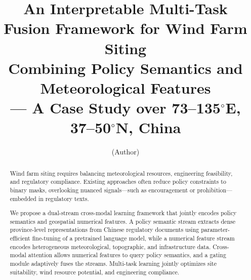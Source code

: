 \documentclass[12pt, a4paper]{article}
\begin{document}
\title{\textbf{An Interpretable Multi-Task Fusion Framework for
Wind Farm Siting\\[0.3em]
Combining Policy Semantics and Meteorological Features}\\[0.5em]
{\large --- A Case Study over 73--135$^\circ$E, 37--50$^\circ$N, China}}
\author{(Author)}
\date{}
\maketitle
\thispagestyle{fancy}

\begin{abstract}
Wind farm siting requires balancing meteorological resources, engineering feasibility, and regulatory compliance. Existing approaches often reduce policy constraints to binary masks, overlooking nuanced signals—such as encouragement or prohibition—embedded in regulatory texts.

We propose a dual-stream cross-modal learning framework that jointly encodes policy semantics and geospatial numerical features. A policy semantic stream extracts dense province-level representations from Chinese regulatory documents using parameter-efficient fine-tuning of a pretrained language model, while a numerical feature stream encodes heterogeneous meteorological, topographic, and infrastructure data. Cross-modal attention allows numerical features to query policy semantics, and a gating module adaptively fuses the streams. Multi-task learning jointly optimizes site suitability, wind resource potential, and engineering compliance.


\end{abstract}
\end{document}
